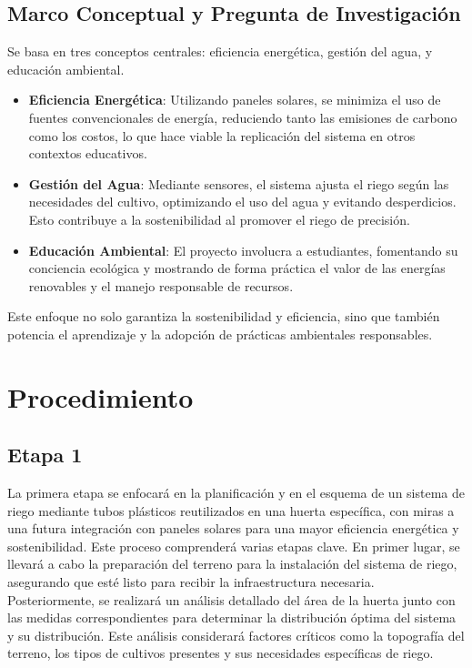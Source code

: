 \documentclass[12pt]{article}
\begin{document}
\subsection{Marco Conceptual y Pregunta de Investigación}
Se basa en tres conceptos centrales: eficiencia energética, gestión del agua, y educación ambiental.
\begin{itemize}
      \item \textbf{Eficiencia Energética}: Utilizando paneles solares, se minimiza el uso de fuentes convencionales de energía, reduciendo tanto las emisiones de carbono como los costos, lo que hace viable la replicación del sistema en otros contextos educativos.
      \item \textbf{Gestión del Agua}: Mediante sensores, el sistema ajusta el riego según las necesidades del cultivo, optimizando el uso del agua y evitando desperdicios. Esto contribuye a la sostenibilidad al promover el riego de precisión.
      \item \textbf{Educación Ambiental}: El proyecto involucra a estudiantes, fomentando su conciencia ecológica y mostrando de forma práctica el valor de las energías renovables y el manejo responsable de recursos.
\end{itemize}

Este enfoque no solo garantiza la sostenibilidad y eficiencia, sino que también potencia el aprendizaje y la adopción de prácticas ambientales responsables.
\newpage
\section{Procedimiento}

\subsection{Etapa 1}
La primera etapa se enfocará en la planificación y en el esquema de un sistema de riego mediante tubos plásticos reutilizados en una huerta específica, con miras a una futura integración con paneles solares para una mayor eficiencia energética y sostenibilidad. Este proceso comprenderá varias etapas clave. En primer lugar, se llevará a cabo la preparación del terreno para la instalación del sistema de riego, asegurando que esté listo para recibir la infraestructura necesaria. Posteriormente, se realizará un análisis detallado del área de la huerta junto con las medidas correspondientes para determinar la distribución óptima del sistema y su distribución. Este análisis considerará factores críticos como la topografía del terreno, los tipos de cultivos presentes y sus necesidades específicas de riego.
\end{document}
